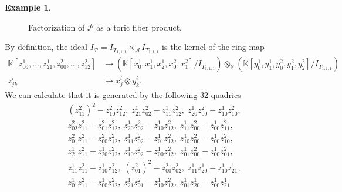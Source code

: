 \documentclass[12pt,reqno]{amsart}   	%
\theoremstyle{plain}
\theoremstyle{definition}
\newtheorem{example}[theorem]{Example}
\theoremstyle{remark}
\begin{document}
\begin{example}
\begin{figure}[H]
    \caption{Factorization of $\mathcal{P}$ as a toric fiber product.}
\end{figure}
By definition, the ideal $I_{\mathcal{P}} =I_{T_{1,1,1}} \times_{\mathcal{A}} I_{T_{1,1,1}}$ is the kernel of the ring map
\begin{align*}
            \mathbb{K}[z^1_{00},\dots,z^1_{21},z^2_{00},\dots, z^2_{12}] &\longrightarrow \left( \mathbb{K}[x^1_0,x^1_1,x^1_2,x^2_0,x^2_1]/I_{T_{1,1,1}} \right) \otimes_{\mathbb{K}} \left( \mathbb{K}[y^1_0,y^1_1,y^2_0,y^2_1,y^2_2]/I_{T_{1,1,1}} \right) \\
        z^i_{jk} &\longmapsto x^i_j \otimes y^i_k.
\end{align*}
We can calculate that it is generated by the following 32 quadrics
\begin{align*}
& %
(z^2_{11})^2 - z^2_{10}z^2_{12},\;z^1_{21}z^2_{02} - z^1_{11}z^2_{12},\;z^1_{20}z^2_{00} - z^1_{10}z^2_{10} 
,\; \\ &z^2_{02}z^2_{11} - z^2_{01}z^2_{12},\;z^1_{20}z^2_{02} - z^1_{10}z^2_{12},\;z^1_{11}z^2_{00} - z^1_{00}z^2_{11} 
,\; \\ &z^2_{01}z^2_{11} - z^2_{00}z^2_{12},\;z^1_{11}z^2_{02} - z^1_{01}z^2_{12},\;z^1_{10}z^2_{00} - z^1_{00}z^2_{10} 
,\; \\ &z^1_{21}z^2_{11} - z^1_{20}z^2_{12},\;z^1_{10}z^2_{02} - z^1_{00}z^2_{12},\;z^1_{01}z^2_{00} - z^1_{00}z^2_{01} 
,\; \\ &z^1_{11}z^2_{11} - z^1_{10}z^2_{12},\;(z^2_{01})^2 - z^2_{00}z^2_{02},\;z^1_{11}z^1_{20} - z^1_{10}z^1_{21} 
,\; \\ &z^1_{01}z^2_{11} - z^1_{00}z^2_{12},\;z^1_{21}z^2_{01} - z^1_{10}z^2_{12},\;z^1_{01}z^1_{20} - z^1_{00}z^1_{21} 

\end{align*}
\end{example}
\end{document}
